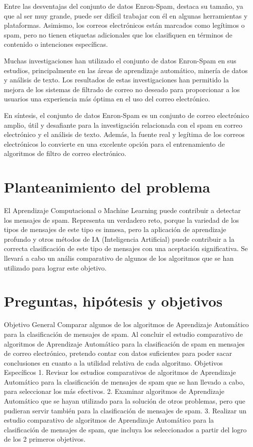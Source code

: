 Entre las desventajas del conjunto de datos Enron-Spam, destaca su tamaño, ya que al ser muy grande, puede ser difícil trabajar con él en algunas herramientas y plataformas. Asimismo, los correos electrónicos están marcados como legítimos o spam, pero no tienen etiquetas adicionales que los clasifiquen en términos de contenido o intenciones específicas.

Muchas investigaciones han utilizado el conjunto de datos Enron-Spam en sus estudios, principalmente en las áreas de aprendizaje automático, minería de datos y análisis de texto. Los resultados de estas investigaciones han permitido la mejora de los sistemas de filtrado de correo no deseado para proporcionar a los usuarios una experiencia más óptima en el uso del correo electrónico.

En síntesis, el conjunto de datos Enron-Spam es un conjunto de correo electrónico amplio, útil y desafiante para la investigación relacionada con el spam en correo electrónico y el análisis de texto. Además, la fuente real y legítima de los correos electrónicos lo convierte en una excelente opción para el entrenamiento de algoritmos de filtro de correo electrónico.	
\section{Planteanimiento del problema}
El Aprendizaje Computacional o Machine Learning puede contribuir a detectar los mensajes de spam. Representa un verdadero reto, porque la variedad de los tipos de mensajes de este tipo es inmesa, pero la aplicación de aprendizaje profundo y otros métodos de IA (Inteligencia Artificial) puede contribuir a la correcta clasificación de este tipo de mensajes con una aceptación significativa. Se llevará a cabo un anális comparativo de  algunos de los algoritmos que se han utilizado para lograr este objetivo.
\section{Preguntas, hipótesis y objetivos}
Objetivo General
Comparar algunos de los algoritmos de Aprendizaje Automático para la clasificación de mensajes de spam. Al concluir el estudio comparativo de algoritmos de Aprendizaje Automático para la clasificación de spam en mensajes de correo electrónico, pretendo contar con datos suficientes para poder sacar conclusiones en cuanto a la utilidad relativa de cada algoritmo.
Objetivos Específicos
1. Revisar los estudios comparativos de algoritmos de Aprendizaje Automático para la clasificación de mensajes de spam que se han llevado a cabo, para seleccionar los más efectivos.
2. Examinar algoritmos de Aprendizaje Automático que se hayan utilizado para la solución de otros problemas, pero que pudieran servir también para la clasificación de mensajes de spam.
3. Realizar un estudio comparativo de algoritmos de Aprendizaje Automático para la clasificación de mensajes de spam, que incluya los seleccionados a partir del logro de los 2 primeros objetivos.
